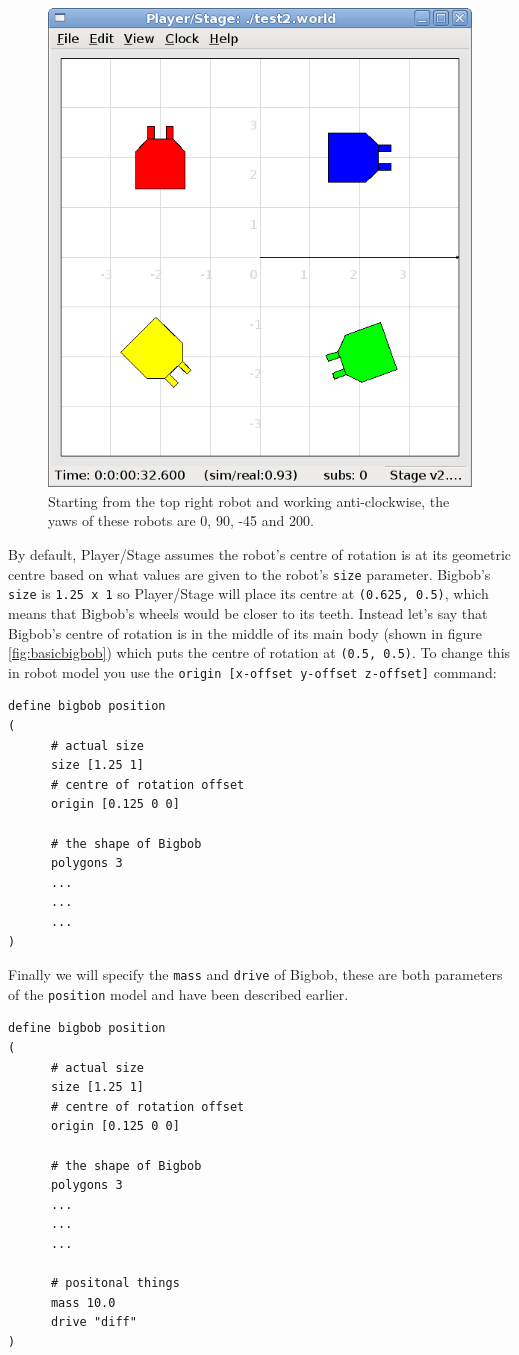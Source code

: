 \documentclass[a4paper]{article}
\newcommand{\plst}{Player/Stage\xspace}
\begin{document}
\begin{figure}
	\centering
	\includegraphics[width=0.6\linewidth]{./pics/robot_building/yaw_examples.png} 
	\caption{Starting from the top right robot and working anti-clockwise, the yaws of these robots are 0, 90, -45 and 200.}
	\label{fig:yaws}
\end{figure}

By default, \plst assumes the robot's centre of rotation is at its geometric centre based on what values are given to the robot's \verb|size| parameter. Bigbob's \verb|size| is \verb|1.25 x 1| so \plst will place its centre at \verb|(0.625, 0.5)|, which means that Bigbob's wheels would be closer to its teeth. Instead let's say that Bigbob's centre of rotation is in the middle of its main body (shown in figure \ref{fig:basicbigbob}) which puts the centre of rotation at \verb|(0.5, 0.5)|. To change this in robot model you use the \verb|origin [x-offset y-offset z-offset]| command:
\begin{verbatim}
define bigbob position
(
      # actual size
      size [1.25 1]
      # centre of rotation offset
      origin [0.125 0 0]

      # the shape of Bigbob
      polygons 3
      ...
      ...
      ...
)
\end{verbatim}

Finally we will specify the \verb|mass| and \verb|drive| of Bigbob, these are both parameters of the \verb|position| model and have been described earlier.
\begin{verbatim}
define bigbob position
(
      # actual size
      size [1.25 1]
      # centre of rotation offset
      origin [0.125 0 0]

      # the shape of Bigbob
      polygons 3
      ...
      ...
      ...
      
      # positonal things
      mass 10.0
      drive "diff"
)
\end{verbatim}
\end{document}
